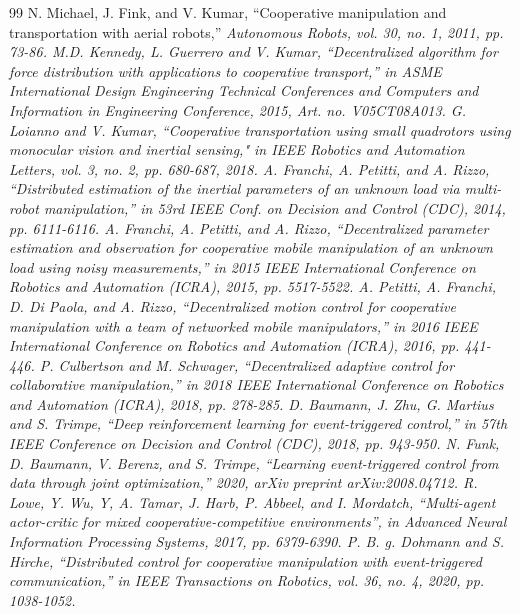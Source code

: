 \documentclass[letterpaper, 10 pt, conference]{ieeeconf} %
\begin{document}
\begin{thebibliography}{99}
 N. Michael, J. Fink, and V. Kumar, “Cooperative manipulation and transportation with aerial robots,” \it{}Autonomous Robots\rm{}, vol. 30, no. 1, 2011, pp. 73-86.
 M.D. Kennedy, L. Guerrero and V. Kumar, “Decentralized algorithm for force distribution with applications to cooperative transport,” in \it{}ASME International Design Engineering Technical Conferences and Computers and Information in Engineering Conference\rm{}, 2015, Art. no. V05CT08A013.
 G. Loianno and V. Kumar, “Cooperative transportation using small quadrotors using monocular vision and inertial sensing," in \it{}IEEE Robotics and Automation Letters\rm{}, vol. 3, no. 2, pp. 680-687, 2018.
 A. Franchi, A. Petitti, and A. Rizzo, “Distributed estimation of the inertial parameters of an unknown load via multi-robot manipulation,” in \it{}53rd IEEE Conf. on Decision and Control (CDC)\rm{}, 2014, pp. 6111-6116.
 A. Franchi, A. Petitti, and A. Rizzo, “Decentralized parameter estimation and observation for cooperative mobile manipulation of an unknown load using noisy measurements,” in \it{}2015 IEEE International Conference on Robotics and Automation (ICRA)\rm{}, 2015, pp. 5517-5522.
 A. Petitti, A. Franchi, D. Di Paola, and A. Rizzo, “Decentralized motion control for cooperative manipulation with a team of networked mobile manipulators,” in \it{}2016 IEEE International Conference on Robotics and Automation (ICRA)\rm{}, 2016, pp. 441-446.
 P. Culbertson and M. Schwager, “Decentralized adaptive control for collaborative manipulation,” in \it{}2018 IEEE International Conference on Robotics and Automation (ICRA)\rm{}, 2018, pp. 278-285.
 D. Baumann, J. Zhu, G. Martius and S. Trimpe, “Deep reinforcement learning for event-triggered control,” in \it{}57th IEEE Conference on Decision and Control (CDC)\rm{}, 2018, pp. 943-950.
 N. Funk, D. Baumann, V. Berenz, and S. Trimpe, “Learning event-triggered control from data through joint optimization,” 2020, arXiv preprint arXiv:2008.04712.
 R. Lowe, Y. Wu, Y, A. Tamar, J. Harb, P. Abbeel, and I. Mordatch, “Multi-agent actor-critic for mixed cooperative-competitive environments”, in \it{}Advanced Neural Information Processing Systems\rm{}, 2017, pp. 6379-6390.
 P. B. g. Dohmann and S. Hirche, “Distributed control for cooperative manipulation with event-triggered communication,” in \it{}IEEE Transactions on Robotics\rm{}, vol. 36, no. 4, 2020, pp. 1038-1052.

\end{thebibliography}
\end{document}
